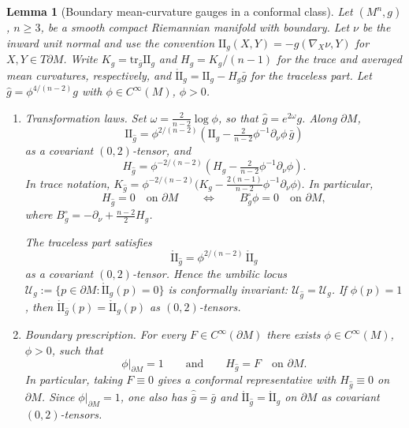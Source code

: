 \documentclass[11pt,reqno,a4paper]{amsart}
\numberwithin{equation}{section}
\theoremstyle{plain}
\newtheorem{lemma}[theorem]{Lemma}
\theoremstyle{remark}
\theoremstyle{plain}
\begin{document}
\begin{lemma}[Boundary mean-curvature gauges in a conformal class]
\label{lem:boundary-gauge}
Let $(M^n,g)$, $n\ge3$, be a smooth compact Riemannian manifold with boundary.
Let $\nu$ be the inward unit normal and use the convention
$\mathrm{II}_g(X,Y)=-g(\nabla_X\nu,Y)$ for $X,Y\in T\partial M$.
Write $K_g=\mathrm{tr}_{\bar g}\mathrm{II}_g$ and $H_g=K_g/(n-1)$ for the
trace and averaged mean curvatures, respectively, and
$\mathring{\mathrm{II}}_g=\mathrm{II}_g-H_g\bar g$ for the traceless part.
Let $\hat g=\phi^{4/(n-2)}g$ with $\phi\in C^\infty(M)$, $\phi>0$.

\begin{enumerate}
\item[\textup{(i)}]
\emph{Transformation laws.}
Set $\omega=\frac{2}{n-2}\log\phi$, so that $\hat g=e^{2\omega}g$.
Along $\partial M$,
\begin{equation}\label{eq:II-conformal}
\mathrm{II}_{\hat g}
=\phi^{2/(n-2)}\!\left(
\mathrm{II}_g
-\tfrac{2}{n-2}\phi^{-1}\partial_\nu\phi\,\bar g
\right)
\end{equation}
as a covariant $(0,2)$-tensor, and
\begin{equation}\label{eq:H-conformal}
H_{\hat g}
=\phi^{-2/(n-2)}\!\left(
H_g-\tfrac{2}{n-2}\phi^{-1}\partial_\nu\phi
\right).
\end{equation}
In trace notation,
$K_{\hat g}
=\phi^{-2/(n-2)}\bigl(
K_g-\frac{2(n-1)}{n-2}\phi^{-1}\partial_\nu\phi
\bigr)$.
In particular,
\begin{equation}\label{eq:H-zero-iff-B}
H_{\hat g}=0\quad\text{on }\partial M
\qquad\Longleftrightarrow\qquad
B_g^\circ\phi=0\quad\text{on }\partial M,
\end{equation}
where $B_g^\circ=-\partial_\nu+\frac{n-2}{2}H_g$.

The traceless part satisfies
\begin{equation}\label{eq:IIring-conformal}
\mathring{\mathrm{II}}_{\hat g}
=\phi^{2/(n-2)}\,\mathring{\mathrm{II}}_g
\end{equation}
as a covariant $(0,2)$-tensor.
Hence the umbilic locus
$\mathcal U_g:=\{p\in\partial M:\mathring{\mathrm{II}}_g(p)=0\}$
is conformally invariant: $\mathcal U_{\hat g}=\mathcal U_g$.
If $\phi(p)=1$, then $\mathring{\mathrm{II}}_{\hat g}(p)=\mathring{\mathrm{II}}_g(p)$
as $(0,2)$-tensors.

\item[\textup{(ii)}]
\emph{Boundary prescription.}
For every $F\in C^\infty(\partial M)$ there exists $\phi\in C^\infty(M)$,
$\phi>0$, such that
\[
\phi|_{\partial M}=1
\qquad\text{and}\qquad
H_{\hat g}=F
\quad\text{on }\partial M.
\]
In particular, taking $F\equiv0$ gives a conformal representative with
$H_{\hat g}\equiv0$ on $\partial M$.
Since $\phi|_{\partial M}=1$, one also has
$\hat{\bar g}=\bar g$ and
$\mathring{\mathrm{II}}_{\hat g}=\mathring{\mathrm{II}}_g$
on $\partial M$ as covariant $(0,2)$-tensors.


\end{enumerate}
\end{lemma}
\end{document}
